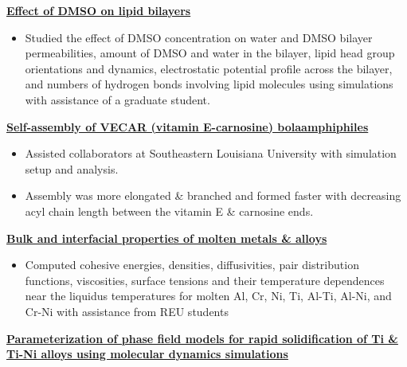 \begin{cventries}
{\begin{cvitems}
            \item {\textbf{\underline{Effect of DMSO on lipid bilayers}}}
                \vspace{2pt}
                \begin{itemize}
                    \item Studied the effect of DMSO concentration on water and DMSO bilayer permeabilities, amount of DMSO and water in the bilayer, lipid head group orientations and dynamics, electrostatic potential profile across the bilayer, and numbers of hydrogen bonds involving lipid molecules using simulations with assistance of a graduate student.
                \end{itemize}
            \item {\textbf{\underline{Self-assembly of VECAR (vitamin E-carnosine) bolaamphiphiles}}}
                \vspace{2pt}
                \begin{itemize}
                \item {Assisted collaborators at Southeastern Louisiana University with simulation setup and analysis.}
                \item{Assembly was more elongated \& branched and formed faster with decreasing acyl chain length between the vitamin E \& carnosine ends.}
                \end{itemize}
            \item {\textbf{\underline{Bulk and interfacial properties of molten metals \& alloys}}}
                \vspace{2pt}
                \begin{itemize}
                    \item Computed cohesive energies, densities, diffusivities, pair distribution functions, viscosities, surface tensions and their temperature dependences near the liquidus temperatures for molten Al, Cr, Ni, Ti, Al-Ti, Al-Ni, and Cr-Ni with assistance from REU students
                \end{itemize}
            \item {\textbf{\underline{Parameterization of phase field models for rapid solidification of Ti \& Ti-Ni alloys using molecular dynamics simulations}}}
                \vspace{2pt}

\end{cvitems}}
\end{cventries}

